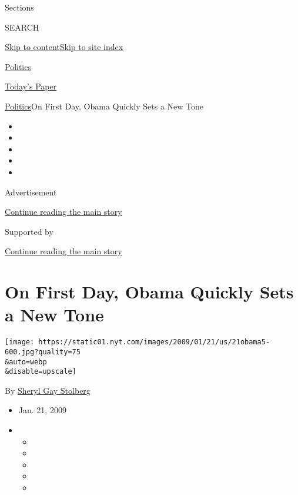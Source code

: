 Sections

SEARCH

\protect\hyperlink{site-content}{Skip to
content}\protect\hyperlink{site-index}{Skip to site index}

\href{https://www.nytimes.com/section/politics}{Politics}

\href{https://myaccount.nytimes.com/auth/login?response_type=cookie\&client_id=vi}{}

\href{https://www.nytimes.com/section/todayspaper}{Today's Paper}

\href{/section/politics}{Politics}\textbar{}On First Day, Obama Quickly
Sets a New Tone

\begin{itemize}
\item
\item
\item
\item
\item
\end{itemize}

Advertisement

\protect\hyperlink{after-top}{Continue reading the main story}

Supported by

\protect\hyperlink{after-sponsor}{Continue reading the main story}

\hypertarget{on-first-day-obama-quickly-sets-a-new-tone}{%
\section{On First Day, Obama Quickly Sets a New
Tone}\label{on-first-day-obama-quickly-sets-a-new-tone}}

\texttt{[image: https://static01.nyt.com/images/2009/01/21/us/21obama5-600.jpg?quality=75\\\&auto=webp\\\&disable=upscale]}

By \href{https://www.nytimes.com/by/sheryl-gay-stolberg}{Sheryl Gay
Stolberg}

\begin{itemize}
\item
  Jan. 21, 2009
\item
  \begin{itemize}
  \item
  \item
  \item
  \item
  \item
  \end{itemize}
\end{itemize}


